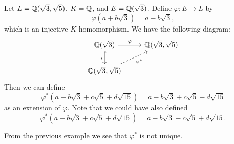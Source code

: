 \begin{example}
  Let $L = \mathbb{Q}(\sqrt{3}, \sqrt{5})$, $K = \mathbb{Q}$, and
  $E = \mathbb{Q}(\sqrt{3})$. Define $\varphi : E \to L$
  by
  \[
    \varphi(a + b\sqrt{3}) = a - b\sqrt{3},
  \]
  which is an injective $K$-homomorphism. We have the
  following diagram:
  \[
  \begin{tikzcd}
    \Q(\sqrt{3}) \dar[hook, swap, "i"] \rar{\varphi} & \Q(\sqrt{3}, \sqrt{5}) \\
    \Q(\sqrt{3}, \sqrt{5}) \urar[dashed, "\varphi^*"'] &
  \end{tikzcd}
  \]
  Then we can define
  \[
    \varphi^*(a + b\sqrt{3} + c\sqrt{5} + d\sqrt{15})
    = a - b\sqrt{3} + c\sqrt{5} - d\sqrt{15}
  \]
  as an extension of $\varphi$. Note that we could have
  also defined
  \[
    \varphi^*(a + b\sqrt{3} + c\sqrt{5} + d\sqrt{15})
    = a - b\sqrt{3} - c\sqrt{5} + d\sqrt{15}.
  \]
\end{example}

\begin{remark}
  From the previous example we see that
  $\varphi^*$ is not unique.
\end{remark}
